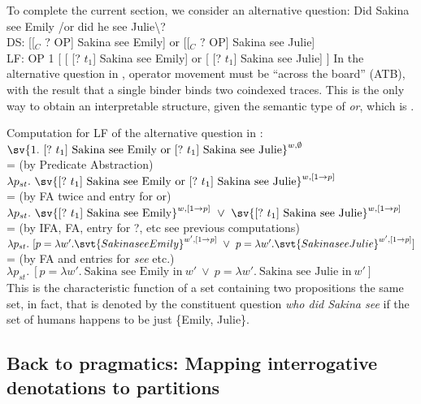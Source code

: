\clearpage
To complete the current section, we consider an alternative question:
%
%
\ex Did Sakina see Emily /or did he see Julie\textbackslash ?\\
DS: [[$_{C}$ ? OP] Sakina see Emily] or [[$_{C}$ ? OP] Sakina see Julie]\\
LF: OP 1 [ [ [? $t_{1}$] Sakina see Emily] or [ [? $t_{1}$] Sakina see Julie] ]
\xe
%
In the alternative question in \Last, operator movement must be ``across the
board'' (ATB), with the result that a single binder binds two coindexed traces.
This is the only way to obtain an interpretable structure, given the semantic
type of \emph{or}, which is .

\ex Computation for LF of the alternative question in \Last:\\
$\sv{1.\ [?\ t_{1}]\ \text{Sakina see Emily or}\ [?\ t_{1}]\ \text{Sakina see
    Julie}}^{w,\emptyset}$\\
{\small = (by Predicate Abstraction)}\\
$\lambda p_{st}.\ \sv{[?\ t_{1}]\ \text{Sakina see Emily
    or}\ [?\ t_{1}]\ \text{Sakina see
    Julie}}^{w,[1\rightarrow p]}$\\
{\small = (by FA twice and entry for or)}\\
$\lambda p_{st}.\ \sv{[?\ t_{1}]\ \text{Sakina see Emily}}^{w,[1\rightarrow p]}\
\vee\ \sv{[?\ t_{1}]\ \text{Sakina see Julie}}^{w,[1\rightarrow p]}$\\
{\small = (by IFA, FA, entry for ?, etc \dash see previous computations)}\\
$\lambda p_{st}.\ [ p = \lambda w'.\svt{Sakina see Emily}^{w',[1\rightarrow p]}\
\vee\ p = \lambda w'.\svt{Sakina see Julie}^{w',[1\rightarrow p]}]$\\
{\small = (by FA and entries for \emph{see} etc.)}\\
$\lambda p_{st}.\ [ p = \lambda w'.\ \text{Sakina see Emily
  in}\ w'\ \vee\ p = \lambda w'.\ \text{Sakina
  see Julie in}\ w']$\\
\xe
%
This is the characteristic function of a set containing two propositions \dash
the same set, in fact, that is denoted by the constituent question \emph{who did
  Sakina see} if the set of humans happens to be just \{Emily, Julie\}.

\subsection{Back to pragmatics: Mapping interrogative denotations to partitions}
\label{sec:back-to-pragmatics}

